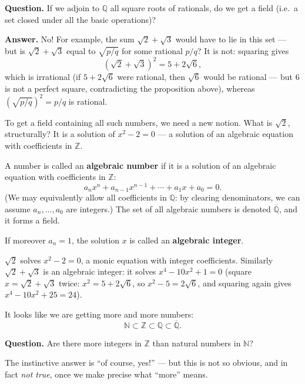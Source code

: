\documentclass[11pt]{report}
\begin{document}
\textbf{Question.} If we adjoin to $\mathbb{Q}$ all square roots of rationals, do we get a field (i.e.\ a set closed under all the basic operations)?

\textbf{Answer.} No! For example, the sum $\sqrt{2} + \sqrt{3}$ would have to lie in this set --- but is $\sqrt{2} + \sqrt{3}$ equal to $\sqrt{p/q}$ for some rational $p/q$? It is not: squaring gives
\[
(\sqrt{2} + \sqrt{3})^2 = 5 + 2\sqrt{6},
\]
which is irrational (if $5 + 2\sqrt{6}$ were rational, then $\sqrt{6}$ would be rational --- but $6$ is not a perfect square, contradicting the proposition above), whereas $(\sqrt{p/q})^2 = p/q$ is rational.

To get a field containing all such numbers, we need a new notion. What is $\sqrt{2}$, structurally? It is a solution of $x^2 - 2 = 0$ --- a solution of an algebraic equation with coefficients in $\mathbb{Z}$.

\begin{defbox}
A number is called an \textbf{algebraic number} if it is a solution of an algebraic equation with coefficients in $\mathbb{Z}$:
\[
a_n x^n + a_{n-1} x^{n-1} + \cdots + a_1 x + a_0 = 0.
\]
(We may equivalently allow all coefficients in $\mathbb{Q}$: by clearing denominators, we can assume $a_n, \ldots, a_0$ are integers.) The set of all algebraic numbers is denoted $\overline{\mathbb{Q}}$, and it forms a field.
\end{defbox}

\begin{defbox}
If moreover $a_n = 1$, the solution $x$ is called an \textbf{algebraic integer}.
\end{defbox}

\begin{exbox}
$\sqrt{2}$ solves $x^2 - 2 = 0$, a monic equation with integer coefficients. Similarly $\sqrt{2} + \sqrt{3}$ is an algebraic integer: it solves $x^4 - 10x^2 + 1 = 0$ (square $x = \sqrt{2}+\sqrt{3}$ twice: $x^2 = 5 + 2\sqrt{6}$, so $x^2 - 5 = 2\sqrt{6}$, and squaring again gives $x^4 - 10x^2 + 25 = 24$).
\end{exbox}

It looks like we are getting more and more numbers:
\[
\mathbb{N} \subset \mathbb{Z} \subset \mathbb{Q} \subset \overline{\mathbb{Q}}.
\]

\textbf{Question.} Are there more integers in $\mathbb{Z}$ than natural numbers in $\mathbb{N}$?

The instinctive answer is ``of course, yes!'' --- but this is not so obvious, and in fact \emph{not true}, once we make precise what ``more'' means.
\end{document}
